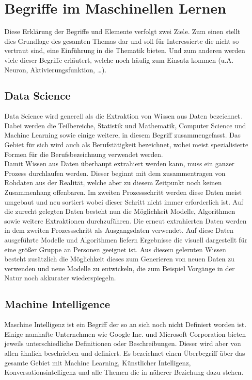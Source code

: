 \chapter{Begriffe im Maschinellen Lernen}
\label{cha:Begriffe}

Diese Erklärung der Begriffe und Elemente verfolgt zwei Ziele.
Zum einen stellt dies Grundlage des gesamten Themas dar und soll für Interessierte die nicht so vertraut sind, eine Einführung in die Thematik bieten. 
Und zum anderen werden viele dieser Begriffe erläutert, welche noch häufig zum Einsatz kommen (u.A. Neuron, Aktivierungsfunktion, …).

\section{Data Science}

Data Science wird generell als die Extraktion von Wissen aus Daten bezeichnet. 
Dabei werden die Teilbereiche, Statistik und Mathematik, Computer Science und Machine Learning sowie einige weitere, in diesem Begriff zusammengefasst. 
Das Gebiet für sich wird auch als Berufstätigkeit bezeichnet, wobei meist spezialisierte Formen für die Berufsbezeichnung verwendet werden.\\

Damit Wissen aus Daten überhaupt extrahiert werden kann, muss ein ganzer Prozess durchlaufen werden. 
Dieser beginnt mit dem zusammentragen von Rohdaten aus der Realität, welche aber zu diesem Zeitpunkt noch keinen Zusammenhang offenbaren. 
Im zweiten Prozessschritt werden diese Daten meist umgebaut und neu sortiert wobei dieser Schritt nicht immer erforderlich ist. 
Auf die zurecht gelegten Daten besteht nun die Möglichkeit Modelle, Algorithmen sowie weitere Extraktionen durchzuführen. 
Die erneut extrahierten Daten werden in dem zweiten Prozessschritt als Ausgangsdaten verwendet. 
Auf diese Daten ausgeführte Modelle und Algorithmen liefern Ergebnisse die visuell dargestellt für eine größer Gruppe an Personen geeignet ist. 
Aus diesem gelernten Wissen besteht zusätzlich die Möglichkeit dieses zum Generieren von neuen Daten zu verwenden und neue Modelle zu entwickeln, die zum Beispiel Vorgänge in der Natur noch akkurater wiederspiegeln.

\section{Machine Intelligence}

Maschine Intelligenz ist ein Begriff der so an sich noch nicht Definiert worden ist. 
Einige namhafte Unternehmen wie Google Inc. und Microsoft Corporation bieten jeweils unterschiedliche Definitionen oder Beschreibungen. 
Dieser wird aber von allen ähnlich beschrieben und definiert. 
Es bezeichnet einen Überbegriff über das gesamte Gebiet mit Machine Learning, Künstlicher Intelligenz, Konversationsintelligenz und alle Themen die in näherer Beziehung dazu stehen. 

